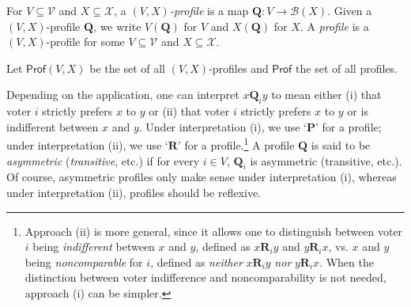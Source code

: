 \documentclass[runningheads]{llncs}
\begin{document}

\begin{definition}\label{ProfileDef} \textnormal{For $V\subseteq\mathcal{V}$ and $X\subseteq\mathcal{X}$, a \emph{$(V,X)$-profile} is a map $\mathbf{Q}:V\to \mathcal{B}(X)$. Given a $(V,X)$-profile $\mathbf{Q}$, we write $V(\mathbf{Q})$ for $V$ and $X(\mathbf{Q})$  for $X$. A \textit{profile} is a $(V,X)$-profile for some $V\subseteq\mathcal{V}$ and $X\subseteq\mathcal{X}$. }

\textnormal{Let $\mathsf{Prof}(V,X)$ be the set of all $(V,X)$-profiles and $\mathsf{Prof}$ the set of all profiles.}\end{definition}




Depending on the application, one can interpret $x\mathbf{Q}_i y$ to mean either (i) that voter $i$ strictly prefers $x$ to $y$ or (ii) that voter $i$ strictly prefers $x$ to $y$ or is indifferent between $x$ and $y$. Under interpretation (i), we use `$\mathbf{P}$' for a profile; under interpretation (ii), we use `$\mathbf{R}$' for a profile.\footnote{\label{VoterNote}Approach (ii) is more general, since it allows one to distinguish between voter $i$ being \textit{indifferent} between $x$ and $y$, defined as $x\mathbf{R}_iy$ and $y\mathbf{R}_ix$, vs. $x$ and $y$ being \textit{noncomparable} for $i$, defined as \textit{neither} $x\mathbf{R}_iy$ \textit{nor} $y\mathbf{R}_ix$. When the distinction between voter indifference and noncomparability is not needed, approach (i) can be simpler.} A profile $\mathbf{Q}$ is said to be \emph{asymmetric} (\emph{transitive}, etc.) if for every $i\in V$, $\mathbf{Q}_i$ is asymmetric (transitive, etc.). Of course, asymmetric profiles only make sense under interpretation (i), whereas under interpretation (ii), profiles should be reflexive.
\end{document}
